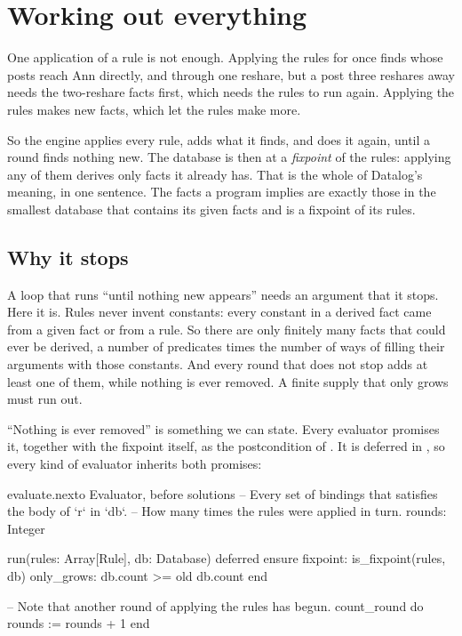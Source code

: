 \chapter{Working out everything}\label{ch:fixpoint}

One application of a rule is not enough. Applying the rules for
 once finds whose posts reach Ann directly, and through one
reshare, but a post three reshares away needs the two-reshare facts first,
which needs the rules to run again. Applying the rules makes new facts, which let the rules make more.

So the engine applies every rule, adds what it finds, and does it again,
until a round finds nothing new. The database is then at a \emph{fixpoint}
of the rules: applying any of them derives only facts it already has. That
is the whole of Datalog's meaning, in one sentence. The facts a program
implies are exactly those in the smallest database that contains its given
facts and is a fixpoint of its rules.

\section{Why it stops}

A loop that runs ``until nothing new appears'' needs an argument that it
stops. Here it is. Rules never invent constants: every constant in a
derived fact came from a given fact or from a rule. So there are only
finitely many facts that could ever be derived, a number of predicates
times the number of ways of filling their arguments with those constants.
And every round that does not stop adds at least one of them, while nothing
is ever removed. A finite supply that only grows must run out.

``Nothing is ever removed'' is something we can state. Every evaluator
promises it, together with the fixpoint itself, as the postcondition of
. It is deferred in , so every kind of evaluator
inherits both promises:

\begin{addbefore}{evaluate.nex}{to Evaluator, before solutions}{  -- Every set of bindings that satisfies the body of `r` in `db`.}
  -- How many times the rules were applied in turn.
  rounds: Integer

  run(rules: Array[Rule], db: Database)
  deferred
  ensure
    fixpoint: is_fixpoint(rules, db)
    only_grows: db.count >= old db.count
  end

  -- Note that another round of applying the rules has begun.
  count_round
  do
    rounds := rounds + 1
  end
\end{addbefore}

